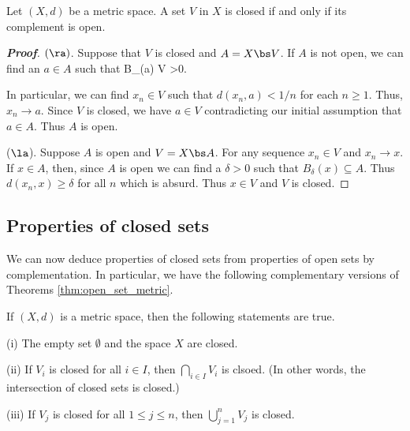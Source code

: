 \begin{theorem}\label{thm:closed_complements_open_metric_space}
Let $(X,d)$ be a metric space. A set $V$ in $X$ is closed if and only if its complement is open.
\end{theorem}

\begin{proof}[\bf Proof]
$(\ra)$. Suppose that $V$ is closed and $A=X\bs V$. If $A$ is not open, we can find an $a\in A$ such that
\be
B_\delta(a) \cap V \neq \emptyset\quad {}\delta>0\qquad {}.
\ee

In particular, we can find $x_{n}\in V$ such that $d(x_{n},a)<1/n$ for each $n\geq 1$. Thus, $x_{n}\to a$. Since $V$ is closed, we have $a\in V$ contradicting our initial assumption that $a\in A$. Thus $A$ is open.

($\la$). Suppose $A$ is open and $V=X\bs A$. For any sequence $x_{n}\in V$ and $x_{n}\to x$. If $x\in A$, then, since $A$ is open we can find a $\delta>0$ such that $B_\delta(x)\subseteq A$.
Thus $d(x_{n},x)\geq \delta$ for all $n$ which is absurd. Thus $x\in V$ and $V$ is closed.
\end{proof}



\subsection{Properties of closed sets}

We can now deduce properties of closed sets from properties of open sets by complementation. In particular, we have the following complementary versions of Theorems \ref{thm:open_set_metric}.%

\begin{theorem}\label{thm:closed_set_metric_space}
If $(X,d)$ is a metric space, then the following statements are true.
\ben
\item [(i)] The empty set $\emptyset$ and the space $X$ are closed.
\item [(ii)] If $V_i$ is closed for all $i\in I$, then $\bigcap_{i \in I} V_i$ is clsoed. (In other words, the intersection of closed sets is closed.)
\item [(iii)] If $V_{j}$ is closed for all $1\leq j\leq n$, then $\bigcup_{j=1}^{n} V_{j}$ is closed.
\een
\end{theorem}


